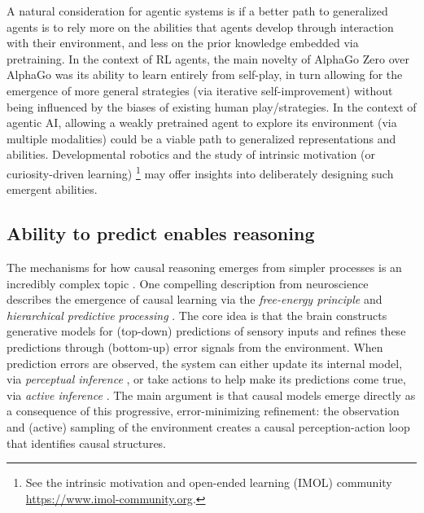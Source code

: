 \documentclass{article}
\theoremstyle{plain}
\theoremstyle{definition}
\theoremstyle{remark}
\begin{document}
A natural consideration for agentic systems is if a better path to generalized agents is to rely more on the abilities that agents develop through interaction with their environment, and less on the prior knowledge embedded via pretraining. In the context of RL agents, the main novelty of AlphaGo Zero \cite{silver2017mastering} over AlphaGo \cite{silver2016mastering} was its ability to learn entirely from self-play, in turn allowing for the emergence of more general strategies (via iterative self-improvement) without being influenced by the biases of existing human play/strategies. In the context of agentic AI, allowing a weakly pretrained agent to explore its environment (via multiple modalities) could be a viable path to generalized representations and abilities. Developmental robotics \cite{cangelosi2015developmental} and the study of intrinsic motivation (or curiosity-driven learning) \cite{barto2013intrinsic,oudeyer2007intrinsic,singh2010intrinsically}\footnote{See the intrinsic motivation and open-ended learning (IMOL) community \url{https://www.imol-community.org}.} may offer insights into deliberately designing such emergent abilities.




\subsection{Ability to predict enables reasoning}

The mechanisms for how causal reasoning emerges from simpler processes is an incredibly complex topic \cite{ellis2012top,gopnik2012reconstructing,hoel2013quantifying}. One compelling description from neuroscience describes the emergence of causal learning via the \emph{free-energy principle} \cite{friston2007free,friston2010free} and \emph{hierarchical predictive processing} \cite{clark2013whatever,hohwy2013predictive}. The core idea is that the brain constructs generative models for (top-down) predictions of sensory inputs and refines these predictions through (bottom-up) error signals from the environment. When prediction errors are observed, the system can either update its internal model, via \emph{perceptual inference} \cite{friston2010action}, or take actions to help make its predictions come true, via \emph{active inference} \cite{friston2003learning}. The main argument is that causal models emerge directly as a consequence of this progressive, error-minimizing refinement: the observation and (active) sampling of the environment creates a causal perception-action loop that identifies causal structures.
\end{document}
